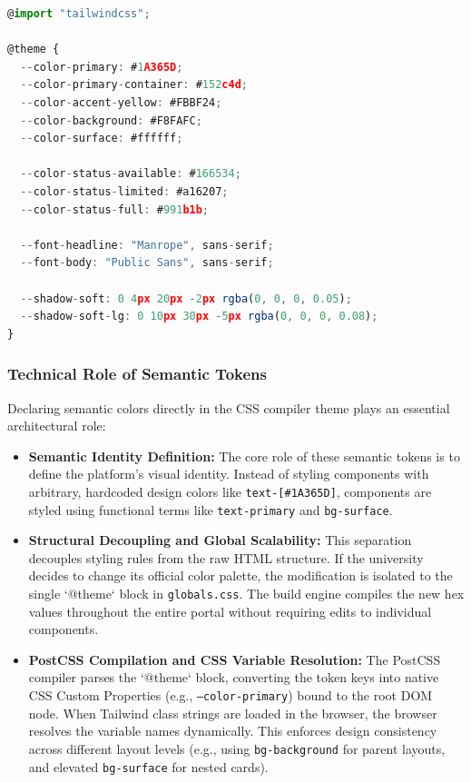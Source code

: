 \documentclass[12pt,a4paper]{article}
\begin{document}
\begin{lstlisting}[language=TypeScript,title={globals.css — Custom design tokens}]
@import "tailwindcss";

@theme {
  --color-primary: #1A365D;                  
  --color-primary-container: #152c4d;        
  --color-accent-yellow: #FBBF24;            
  --color-background: #F8FAFC;              
  --color-surface: #ffffff;                 

  --color-status-available: #166534;         
  --color-status-limited: #a16207;           
  --color-status-full: #991b1b;              

  --font-headline: "Manrope", sans-serif;
  --font-body: "Public Sans", sans-serif;

  --shadow-soft: 0 4px 20px -2px rgba(0, 0, 0, 0.05);
  --shadow-soft-lg: 0 10px 30px -5px rgba(0, 0, 0, 0.08);
}
\end{lstlisting}

\subsubsection{Technical Role of Semantic Tokens}

Declaring semantic colors directly in the CSS compiler theme plays an essential architectural role:
\begin{itemize}[leftmargin=2em]
    \item \textbf{Semantic Identity Definition:} The core role of these semantic tokens is to define the platform's visual identity. Instead of styling components with arbitrary, hardcoded design colors like \texttt{text-[\#1A365D]}, components are styled using functional terms like \texttt{text-primary} and \texttt{bg-surface}.
    \item \textbf{Structural Decoupling and Global Scalability:} This separation decouples styling rules from the raw HTML structure. If the university decides to change its official color palette, the modification is isolated to the single `@theme` block in \texttt{globals.css}. The build engine compiles the new hex values throughout the entire portal without requiring edits to individual components.
    \item \textbf{PostCSS Compilation and CSS Variable Resolution:} The PostCSS compiler parses the `@theme` block, converting the token keys into native CSS Custom Properties (e.g., \texttt{--color-primary}) bound to the root DOM node. When Tailwind class strings are loaded in the browser, the browser resolves the variable names dynamically. This enforces design consistency across different layout levels (e.g., using \texttt{bg-background} for parent layouts, and elevated \texttt{bg-surface} for nested cards).
\end{itemize}
\end{document}
